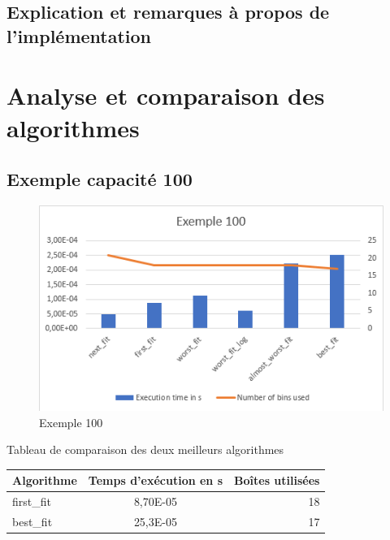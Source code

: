 \documentclass{article}
\begin{document}
\subsection{Explication et remarques à propos de l'implémentation}

\section{Analyse et comparaison des algorithmes}

\clearpage
\subsection{Exemple capacité 100}
\begin{figure}[h]
\begin{center}
\includegraphics{exemple100.png}
\end{center}
\caption{Exemple 100}
\end{figure}

\begin{center}
Tableau de comparaison des deux meilleurs algorithmes
\begin{tabular}{|l|c|r|}
  \hline
  Algorithme & Temps d'exécution en s & Boîtes utilisées \\
  \hline
  first\_fit & 8,70E-05 & 18 \\
  best\_fit & 25,3E-05  & 17 \\
  \hline
\end{tabular}
\end{center}



\clearpage
\end{document}
